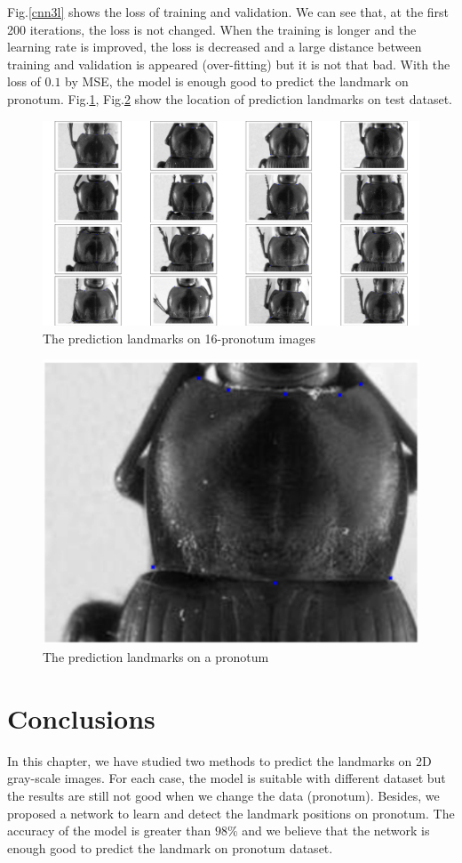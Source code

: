 Fig.\ref{cnn3l} shows the loss of training and validation. We can see that, at the first 200 iterations, the loss is not changed. When the training is longer and the learning rate is improved, the loss is decreased and a large distance between training and validation is appeared (over-fitting) but it is not that bad. With the loss of $0.1$ by MSE, the model is enough good to predict the landmark on pronotum. Fig.\ref{cnn3t}, Fig.\ref{cnn3t1} show the location of prediction landmarks on test dataset.
\begin{figure}[h!]
	\centering
	\includegraphics[scale=0.3]{images/figure_1_cnn3_3000_2}
	\caption{The prediction landmarks on 16-pronotum images}
	\label{cnn3t}
\end{figure}
\begin{figure}[h!]
	\centering
	\includegraphics[scale=0.3]{images/plandmark}
	\caption{The prediction landmarks on a pronotum}
	\label{cnn3t1}
\end{figure}
\section{Conclusions}
In this chapter, we have studied two methods to predict the landmarks on 2D gray-scale images. For each case, the model is suitable with different dataset but the results are still not good when we change the data (pronotum). Besides, we proposed a network to learn and detect the landmark positions on pronotum. The accuracy of the model is greater than $98 \%$ and we believe that the network is enough good to predict the landmark on pronotum dataset.